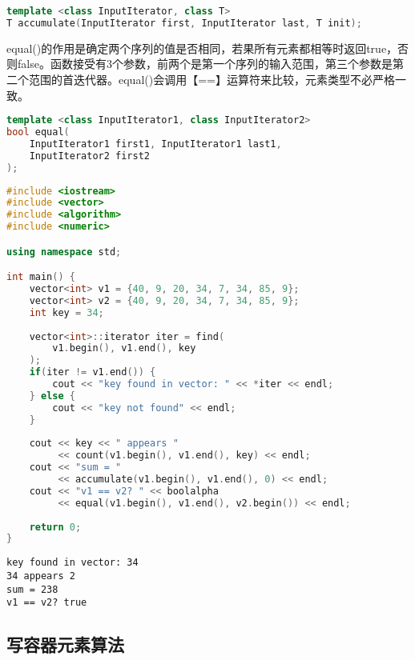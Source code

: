 \begin{lstlisting}[language=C++]
template <class InputIterator, class T>
T accumulate(InputIterator first, InputIterator last, T init);
\end{lstlisting}

equal()的作用是确定两个序列的值是否相同，若果所有元素都相等时返回true，否则false。函数接受有3个参数，前两个是第一个序列的输入范围，第三个参数是第二个范围的首迭代器。equal()会调用【==】运算符来比较，元素类型不必严格一致。

\vspace{-0.5cm}

\begin{lstlisting}[language=C++]
template <class InputIterator1, class InputIterator2>
bool equal(
	InputIterator1 first1, InputIterator1 last1, 
	InputIterator2 first2
);
\end{lstlisting}

\vspace{0.5cm}


\begin{lstlisting}[language=C++]
#include <iostream>
#include <vector>
#include <algorithm>
#include <numeric>

using namespace std;

int main() {
	vector<int> v1 = {40, 9, 20, 34, 7, 34, 85, 9};
	vector<int> v2 = {40, 9, 20, 34, 7, 34, 85, 9};
	int key = 34;
	
	vector<int>::iterator iter = find(
		v1.begin(), v1.end(), key
	);
	if(iter != v1.end()) {
		cout << "key found in vector: " << *iter << endl;
	} else {
		cout << "key not found" << endl;
	}
	
	cout << key << " appears "
		 << count(v1.begin(), v1.end(), key) << endl;
	cout << "sum = "
		 << accumulate(v1.begin(), v1.end(), 0) << endl;
	cout << "v1 == v2? " << boolalpha
		 << equal(v1.begin(), v1.end(), v2.begin()) << endl;
		 
	return 0;
}
\end{lstlisting}

\begin{tcolorbox}
	\begin{verbatim}
key found in vector: 34
34 appears 2
sum = 238
v1 == v2? true
	\end{verbatim}
\end{tcolorbox}

\subsection{写容器元素算法}

